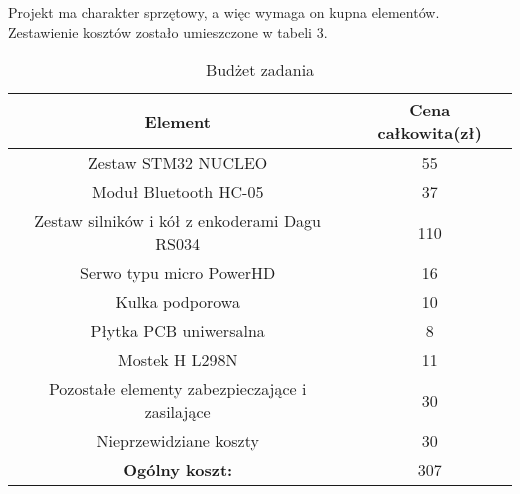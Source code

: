 Projekt ma charakter sprzętowy, a więc wymaga on kupna elementów. Zestawienie kosztów zostało umieszczone w tabeli 3.


\begin{table}[!htbp]
\begin{center}
\begin{tabular}{|c|c|}
\hline
\textbf{Element} & \textbf{Cena całkowita(zł)} \\ \hline\hline
Zestaw STM32 NUCLEO & 55 \\ \hline
Moduł Bluetooth HC-05 & 37 \\ \hline
Zestaw silników i kół z enkoderami Dagu RS034 & 110 \\ \hline
Serwo typu micro PowerHD & 16 \\ \hline
Kulka podporowa & 10 \\ \hline
Płytka PCB uniwersalna & 8 \\ \hline
Mostek H L298N & 11 \\ \hline
Pozostałe elementy zabezpieczające i zasilające & 30 \\ \hline
Nieprzewidziane koszty & 30 \\ \hline\hline
\textbf{Ogólny koszt:} & 307 \\ \hline

\end{tabular}
\caption{Budżet zadania}
\end{center}
\end{table}


